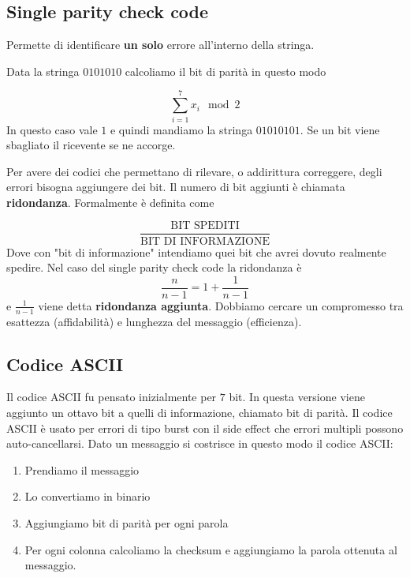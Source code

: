 \documentclass[12pt]{report}
\begin{document}
    \subsection{Single parity check code}
    Permette di identificare \textbf{un solo} errore all'interno della stringa.
    \begin{exmp}
        Data la stringa $0101010$ calcoliamo il bit di parità in questo modo

        $$\sum_{i = 1}^7 x_i \mod{2}$$
        In questo caso vale $1$ e quindi mandiamo la stringa $01010101$. Se un bit viene sbagliato il ricevente se ne accorge.
    \end{exmp}
    Per avere dei codici che permettano di rilevare, o addirittura correggere, degli errori bisogna aggiungere dei bit. Il numero di bit aggiunti è chiamata \textbf{ridondanza}. Formalmente è definita come

    $$\frac{\text{BIT SPEDITI}}{\text{BIT DI INFORMAZIONE}}$$
    Dove con "bit di informazione" intendiamo quei bit che avrei dovuto realmente spedire. Nel caso del single parity check code la ridondanza è
    $$\frac{n}{n-1} = 1 + \frac{1}{n-1}$$
    e $\frac{1}{n-1}$ viene detta \textbf{ridondanza aggiunta}. Dobbiamo cercare un compromesso tra esattezza (affidabilità) e  lunghezza del messaggio (efficienza).

    \subsection{Codice ASCII}
    Il codice ASCII fu pensato inizialmente per $7$ bit. In questa versione viene aggiunto un ottavo bit a quelli di informazione, chiamato bit di parità. Il codice ASCII è usato per errori di tipo burst con il side effect che errori multipli possono auto-cancellarsi.
    Dato un messaggio si costrisce in questo modo il codice ASCII:

    \begin{enumerate}
        \item Prendiamo il messaggio
        \item Lo convertiamo in binario
        \item Aggiungiamo bit di parità per ogni parola
        \item Per ogni colonna calcoliamo la checksum e aggiungiamo la parola ottenuta al messaggio.
    \end{enumerate}
\end{document}

